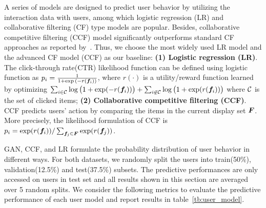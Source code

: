 \documentclass{article} %
\begin{document}
A series of models are designed to predict user behavior by utilizing the interaction data with users, among which logistic regression (LR) and collaborative filtering (CF) type models are popular. Besides, collaborative competitive filtering (CCF) model significantly outperforms standard CF approaches as reported by~\cite{YanLonSmoEtal11b}. Thus, we choose the most widely used LR model and the advanced CF model (CCF) as our baseline: {\bf (1) Logistic regression (LR)}. The click-through rate(CTR) likelihood function can be defined using logistic function as $p_i = \frac{1}{1+\exp{(-r({\bm{f}}_i))}}$, where $r(\cdot)$ is a utility/reward function learned by optimizing $\sum_{i\in {\mathcal{C}}}\log \big(1+\exp(-r({\bm{f}}_i))\big) + \sum_{i \not\in {\mathcal{C}}}\log\big(1+\exp(r({\bm{f}}_i))\big)$ where ${\mathcal{C}}$ is the set of clicked items;
{\bf (2) Collaborative competitive filtering (CCF)}. CCF predicts users' action by comparing the items in the current display set ${\bm{F}}$. More precisely, the likelihood formulation of CCF is $p_i = \exp(r({\bm{f}}_i))/\sum_{{\bm{f}}_j \in {\bm{F}} }\exp(r({\bm{f}}_j))$.

GAN, CCF, and LR formulate the probability distribution of user behavior in different ways. For both datasets, we randomly split the users into train(50\%), validation(12.5\%) and test(37.5\%) subsets. The predictive performances are only accessed on users in test set and all results shown in this section are averaged over 5 random splits. We consider the following metrics to evaluate the predictive performance of each user model and report results in table~\ref{tb:user_model}.
\end{document}
